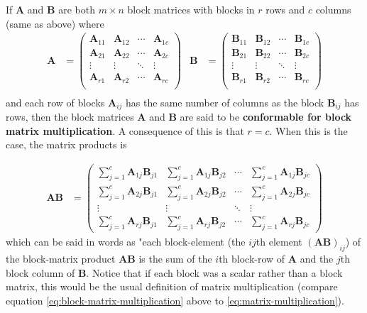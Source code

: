 \documentclass[
]{book}
\theoremstyle{definition}
\theoremstyle{definition}
\theoremstyle{definition}
\theoremstyle{definition}
\theoremstyle{remark}
\begin{document}
If \(\mathbf{A}\) and \(\mathbf{B}\) are both \(m \times n\) block matrices with blocks in \(r\) rows and \(c\) columns (same as above) where
\[
\begin{aligned}
\mathbf{A} & =
\begin{pmatrix} \mathbf{A}_{11} & \mathbf{A}_{12} & \cdots & \mathbf{A}_{1c}\\
\mathbf{A}_{21} & \mathbf{A}_{22} &\cdots & \mathbf{A}_{2c} \\
\vdots & \vdots & \ddots & \vdots \\
\mathbf{A}_{r1} & \mathbf{A}_{r2} &\cdots & \mathbf{A}_{rc} \\
\end{pmatrix} &
\mathbf{B} & =
\begin{pmatrix} \mathbf{B}_{11} & \mathbf{B}_{12} & \cdots & \mathbf{B}_{1c}\\
\mathbf{B}_{21} & \mathbf{B}_{22} &\cdots & \mathbf{B}_{2c} \\
\vdots & \vdots & \ddots & \vdots \\
\mathbf{B}_{r1} & \mathbf{B}_{r2} &\cdots & \mathbf{B}_{rc} \\
\end{pmatrix} \\
\end{aligned}
\]
and each row of blocks \(\mathbf{A}_{ij}\) has the same number of columns as the block \(\mathbf{B}_{ij}\) has rows, then the block matrices \(\mathbf{A}\) and \(\mathbf{B}\) are said to be \textbf{conformable for block matrix multiplication}. A consequence of this is that \(r = c\). When this is the case, the matrix products is

\[
\begin{aligned}
\mathbf{A} \mathbf{B} & =
\begin{pmatrix} \sum_{j = 1}^c \mathbf{A}_{1j} \mathbf{B}_{j1} &  \sum_{j = 1}^c \mathbf{A}_{1j} \mathbf{B}_{j2} & \cdots &  \sum_{j = 1}^c \mathbf{A}_{1j} \mathbf{B}_{jc} \\
\sum_{j = 1}^c \mathbf{A}_{2j} \mathbf{B}_{j1} &  \sum_{j = 1}^c \mathbf{A}_{2j} \mathbf{B}_{j2} & \cdots &  \sum_{j = 1}^c \mathbf{A}_{2j} \mathbf{B}_{jc} \\
\vdots & \vdots & \ddots & \vdots \\
\sum_{j = 1}^c \mathbf{A}_{rj} \mathbf{B}_{j1} &  \sum_{j = 1}^c \mathbf{A}_{rj} \mathbf{B}_{j2} & \cdots &  \sum_{j = 1}^c \mathbf{A}_{rj} \mathbf{B}_{jc} 
\end{pmatrix}  
\end{aligned}
\label{eq:column-row-matrix-multiplication}
\]
which can be said in words as "each block-element (the \(ij\)th element \((\mathbf{A} \mathbf{B})_{ij}\)) of the block-matrix product \(\mathbf{A} \mathbf{B}\) is the sum of the \(i\)th block-row of \(\mathbf{A}\) and the \(j\)th block column of \(\mathbf{B}\). Notice that if each block was a scalar rather than a block matrix, this would be the usual definition of matrix multiplication (compare equation \eqref{eq:block-matrix-multiplication} above to \eqref{eq:matrix-multiplication}).
\end{document}
